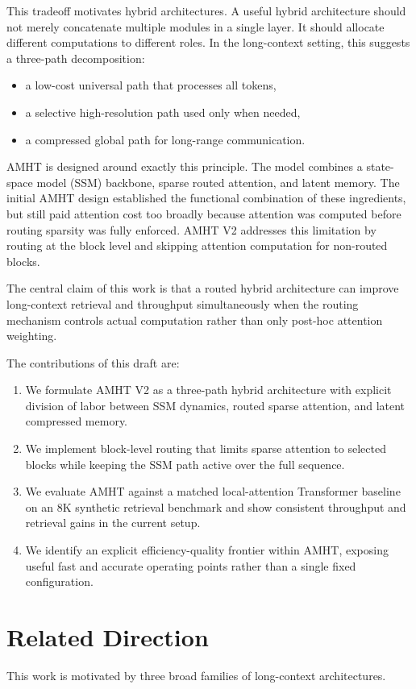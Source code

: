 \documentclass[11pt]{article}
\begin{document}
This tradeoff motivates hybrid architectures. A useful hybrid architecture should not merely concatenate multiple modules in a single layer. It should allocate different computations to different roles. In the long-context setting, this suggests a three-path decomposition:
\begin{itemize}
  \item a low-cost universal path that processes all tokens,
  \item a selective high-resolution path used only when needed,
  \item a compressed global path for long-range communication.
\end{itemize}

AMHT is designed around exactly this principle. The model combines a state-space model (SSM) backbone, sparse routed attention, and latent memory. The initial AMHT design established the functional combination of these ingredients, but still paid attention cost too broadly because attention was computed before routing sparsity was fully enforced. AMHT V2 addresses this limitation by routing at the block level and skipping attention computation for non-routed blocks.

The central claim of this work is that a routed hybrid architecture can improve long-context retrieval and throughput simultaneously when the routing mechanism controls actual computation rather than only post-hoc attention weighting.

The contributions of this draft are:
\begin{enumerate}
  \item We formulate AMHT V2 as a three-path hybrid architecture with explicit division of labor between SSM dynamics, routed sparse attention, and latent compressed memory.
  \item We implement block-level routing that limits sparse attention to selected blocks while keeping the SSM path active over the full sequence.
  \item We evaluate AMHT against a matched local-attention Transformer baseline on an 8K synthetic retrieval benchmark and show consistent throughput and retrieval gains in the current setup.
  \item We identify an explicit efficiency-quality frontier within AMHT, exposing useful fast and accurate operating points rather than a single fixed configuration.
\end{enumerate}

\section{Related Direction}
This work is motivated by three broad families of long-context architectures.
\end{document}

